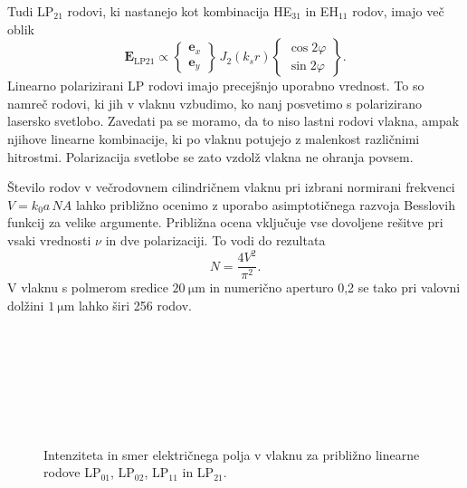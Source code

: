 Tudi LP$_{21}$ rodovi, ki nastanejo kot kombinacija HE$_{31}$
in EH$_{11}$ rodov, imajo več oblik
\begin{equation}
\mathbf{E}_\mathrm{LP21} \propto \left \{
  \begin{matrix}
  \mathbf{e}_x \\ \mathbf{e}_y 
  \end{matrix}
\right \} \, J_2(k_s r)
\left \{
  \begin{matrix}
  \cos 2 \varphi  \\ \sin 2 \varphi 
  \end{matrix}
\right \}.
\end{equation}
Linearno polarizirani LP rodovi imajo precejšnjo uporabno vrednost. To so 
namreč rodovi, ki jih v vlaknu vzbudimo, ko nanj posvetimo s polarizirano 
lasersko svetlobo. Zavedati pa se moramo, da to niso lastni rodovi vlakna, 
ampak njihove linearne kombinacije, ki po vlaknu potujejo z malenkost različnimi
hitrostmi. Polarizacija svetlobe se zato vzdolž vlakna ne ohranja povsem.
\begin{remark}
Število rodov v večrodovnem cilindričnem vlaknu pri izbrani normirani 
frekvenci $V = k_0a\, NA$ lahko približno ocenimo z uporabo asimptotičnega 
razvoja Besslovih funkcij za velike argumente. Približna ocena vključuje 
vse dovoljene rešitve pri vsaki vrednosti $\nu$ in dve polarizaciji. 
To vodi do rezultata
\begin{equation} 
N = \frac{4 V^2}{\pi^2}.
\end{equation}
V vlaknu s polmerom sredice $20~\si{\micro\meter}$ in numerično aperturo 0,2
se tako pri valovni dolžini $1~\si{\micro\meter}$ lahko širi 256 rodov. 
\end{remark}
\begin{figure}[h!]
\centering
\def\svgwidth{93truemm} 
 \\
\def\svgwidth{93truemm} 
 \\
\def\svgwidth{93truemm} 
 \\
\def\svgwidth{93truemm} 
 \\
\def\svgwidth{93truemm} 
 \\
\def\svgwidth{93truemm} 
 \\
\caption{Intenziteta in smer električnega polja v vlaknu za približno linearne rodove
LP$_{01}$, LP$_{02}$, LP$_{11}$ in LP$_{21}$.}
\label{fig:LP}
\end{figure}

